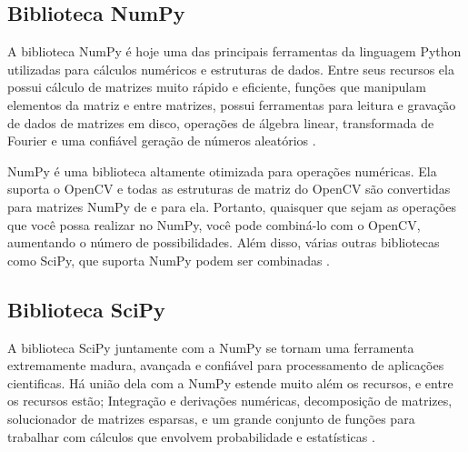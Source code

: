 \subsection{Biblioteca NumPy}
A biblioteca NumPy é hoje uma das principais ferramentas da linguagem Python utilizadas para cálculos numéricos e estruturas de dados. Entre seus recursos ela possui cálculo de matrizes muito rápido e eficiente, funções que manipulam elementos da matriz e entre matrizes, possui ferramentas para leitura e gravação de dados de matrizes em disco, operações de álgebra linear, transformada de Fourier e uma confiável geração de números aleatórios \cite{trinta}. 

NumPy é uma biblioteca altamente otimizada para operações numéricas. Ela suporta o OpenCV e todas as estruturas de matriz do OpenCV são convertidas para matrizes NumPy de e para ela. Portanto, quaisquer que sejam as operações que você possa realizar no NumPy, você pode combiná-lo com o OpenCV, aumentando o número de possibilidades. Além disso, várias outras bibliotecas como SciPy, que suporta NumPy podem ser combinadas \cite{quinze}. 

\subsection{Biblioteca SciPy}
A biblioteca SciPy juntamente com a NumPy se tornam uma ferramenta extremamente madura, avançada e confiável para processamento de aplicações cientificas. Há união dela com a NumPy estende muito além os recursos, e entre os recursos estão; Integração e derivações numéricas, decomposição de matrizes, solucionador de matrizes esparsas, e um grande conjunto de funções para trabalhar com cálculos que envolvem probabilidade e estatísticas \cite{trinta}. 

%	
%

